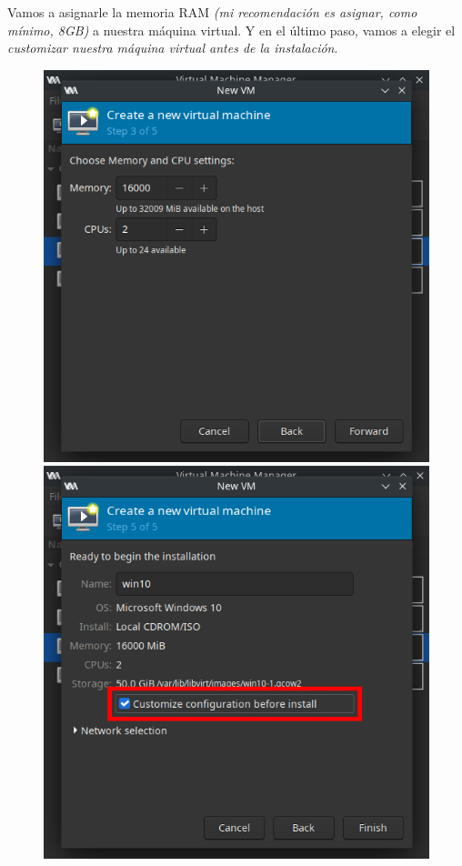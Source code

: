 \documentclass[12pt]{article}
\begin{document}
Vamos a asignarle la memoria RAM \emph{(mi recomendación es asignar, como mínimo, 8GB)} a nuestra máquina virtual. Y en el último paso, vamos a elegir el \emph{customizar nuestra máquina virtual antes de la instalación}.

\begin{figure}[h]
\centering
\begin{minipage}[b]{0.35\textwidth}
\includegraphics[width=\textwidth]{images/vm-memory-setup.png}
\end{minipage}
\hspace{10pt}
\begin{minipage}[b]{0.35\textwidth}
\includegraphics[width=\textwidth]{images/vm-name.png}
\end{minipage}
\end{figure}
\end{document}
